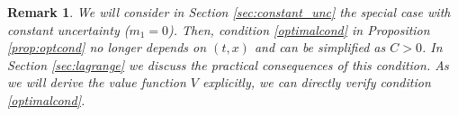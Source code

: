 \documentclass[12pt, letterpaper]{article}
\newtheorem{remark}[theorem]{Remark}
\numberwithin{equation}{section}
\numberwithin{theorem}{section}
\begin{document}
%
\begin{remark}
We will consider in Section \ref{sec:constant_unc} the special  case with  constant uncertainty ($m_1=0$). Then, condition \eqref{optimalcond}   in Proposition \ref{prop:optcond} no longer depends on $(t,x)$ and can be simplified as $C>0$. In Section \ref{sec:lagrange} we discuss the practical consequences  of this condition. As we will derive the value function $V$ explicitly, we can directly verify condition \eqref{optimalcond}.
\end{remark}
\end{document}
